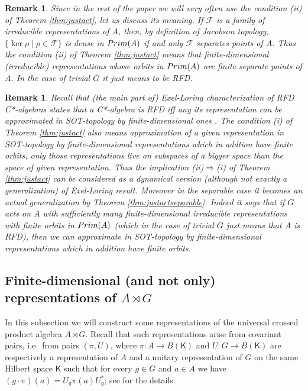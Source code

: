 \documentclass[11 pt, leqno, hidelinks]{amsart}%
\theoremstyle{plain}
\newtheorem{remark}[theorem]{Remark}
\numberwithin{equation}{section}
\newcommand{\Prim}{\textup{Prim}}
\renewcommand{\ker}[0]{\operatorname{ker}}
\newcommand{\Kil}{\mathsf{K}}
\begin{document}
\begin{remark}\label{conditionii} Since in the rest of the paper we will very often use the condition (ii) of Theorem \ref{thm:justact}, let us discuss its meaning. If $\mathcal F$ is a family of irreducible representations of $A$, then, by definition of Jacobson topology,   $\{\ker \rho\;|\; \rho\in \mathcal F\}$ is dense in $\Prim(A)$ if and only $\mathcal F$ separates points of $A$.
Thus the condition (ii) of Theorem \ref{thm:justact} means that finite-dimensional (irreducible) representations whose orbits in $\Prim(A)$ are finite separate points of $A$. In the case
of trivial $G$ it just means to be RFD.
\end{remark}

\begin{remark}\label{DynamicalVersionEL} Recall that (the main part of) Exel-Loring characterization of RFD C*-algebras states that  a  C*-algebra is  RFD iff any its representation can be approximated in SOT-topology by finite-dimensional ones \cite{ExelLoring}. The condition (i) of Theorem \ref{thm:justact} also means approximation of a given representation in SOT-topology by finite-dimensional representations which in addtion have finite orbits, only those representations live on subspaces of a  bigger space than the space of  given representation. Thus the implication  (ii)$\Longrightarrow$(i) of Theorem \ref{thm:justact} can be considered as a dynamical version (although not exactly a generalization) of Exel-Loring result. Moreover in the separable case it becomes an  actual generalization by Theorem \ref{thm:justactseparable}. Indeed  it says that if $G$ acts on $A$  with sufficiently many finite-dimensional irreducible representations with finite orbits in $\Prim(A)$ (which in the case of trivial $G$ just means that $A$ is RFD), then we can approximate in SOT-topology  by finite-dimensional representations which in addition have finite orbits.
\end{remark}




\subsection{Finite-dimensional (and not only) representations of $A \rtimes G$}


In this subsection we will construct some representations of the universal crossed product algebra $A \rtimes G$. Recall that such representations arise from covariant pairs, i.e.\ from pairs $(\pi,U)$, where $\pi:A\to B(\Kil)$ and $U:G \to B(\Kil)$ are respectively a representation of $A$ and a unitary representation of $G$ on the same Hilbert space $\Kil$ such that for every $g \in G$ and $a \in A$ we have $(g\cdot \pi)(a) = U_g \pi(a) U_g^*$; see \cite{Dana1} for the details.
\end{document}
